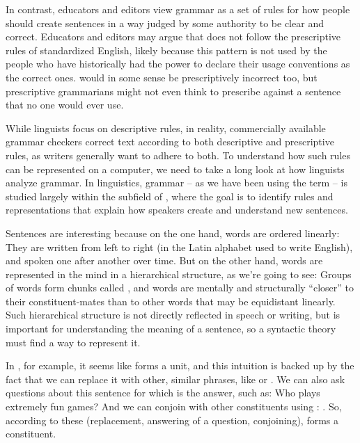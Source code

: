 In contrast, educators and editors view grammar as a  set of rules for how people should create sentences in a way judged by some authority to be clear and correct.  Educators and editors may argue that  does not follow the prescriptive rules of standardized English, likely because this pattern is not used by the people who have historically had the power to declare their usage conventions as the correct ones.   would in some sense be prescriptively incorrect too, but prescriptive grammarians might not even think to prescribe against a sentence that no one would ever use.

While linguists focus on descriptive rules, in reality, commercially available grammar checkers correct text according to both descriptive and prescriptive rules, as writers generally want to adhere to both. To understand how such rules can be represented on a computer, we need to take a long look at how linguists analyze grammar. In linguistics, grammar -- as we have been using the term -- is studied largely within the subfield of , where the goal is to identify rules and representations that explain how speakers create and understand new sentences. 


Sentences are interesting because on the one hand, words are ordered linearly: They are written from left to right (in the Latin alphabet used to write English), and spoken one after another over time.  But on the other hand, words are represented in the mind in a hierarchical structure, as we're going to see: Groups of words form chunks called , and words are mentally and structurally ``closer'' to their constituent-mates than to other words that may be equidistant linearly.  Such hierarchical structure is not directly reflected in speech or writing, but is important for understanding the   meaning of a sentence, so a syntactic theory must find a way to represent it.


 In , for example, it seems like  forms a unit, and this intuition is backed up by the fact that we can replace it with other, similar phrases, like  or .  We can also ask questions about this sentence for which  is the answer, such as: Who plays extremely fun games?  And we can conjoin  with other constituents using : . So, according to these  (replacement, answering of a question, conjoining),  forms a constituent.
 

